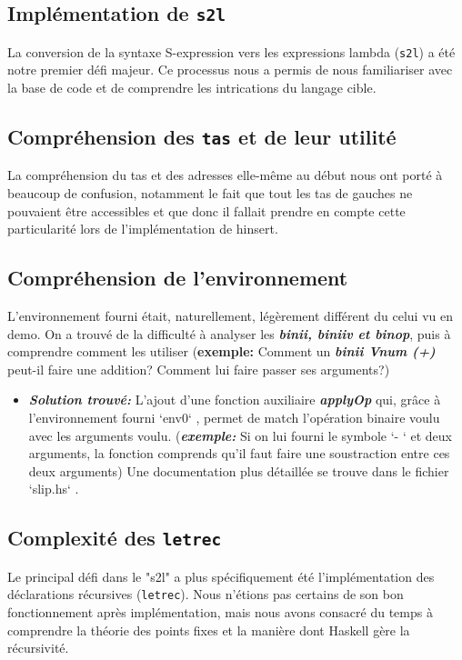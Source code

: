 \documentclass[12pt]{article}
\begin{document}
\subsection{Implémentation de \texttt{s2l}}
La conversion de la syntaxe S-expression vers les expressions lambda (\texttt{s2l}) a été notre premier défi majeur. Ce processus nous a permis de nous familiariser avec la base de code et de comprendre les intrications du langage cible.

\subsection{Compréhension des \texttt{tas} et de leur utilité}
La compréhension du tas et des adresses elle-même au début nous ont porté à beaucoup de confusion, notamment le fait que tout les tas de gauches ne pouvaient être accessibles et que donc il fallait prendre en compte cette particularité lors de l'implémentation de hinsert.

\subsection{Compréhension de l'environnement}
L'environnement fourni était, naturellement, légèrement différent du celui vu en demo. On a trouvé de la difficulté à analyser les \textit{\textbf{binii, biniiv et binop}}, puis à comprendre comment les utiliser (\textbf{exemple:} Comment un \textit{\textbf{binii Vnum (+)}} peut-il faire une addition? Comment lui faire passer ses arguments?)
\begin{itemize}
    \item \textit{\textbf{Solution trouvé: }} L'ajout d'une fonction auxiliaire \textbf{\textit{applyOp}} qui, grâce à l'environnement fourni `env0` , permet de match l'opération binaire voulu avec les arguments voulu.  (\textbf{\textit{exemple:}} Si on lui fourni le symbole `- ` et deux arguments, la fonction comprends qu'il faut faire une soustraction entre ces deux arguments)
    Une documentation plus détaillée  se trouve dans le fichier `slip.hs` .
\end{itemize}

\subsection{Complexité des \texttt{letrec}}
Le principal défi dans le "s2l" a plus spécifiquement été l'implémentation des déclarations récursives (\texttt{letrec}). Nous n'étions pas certains de son bon fonctionnement après implémentation, mais nous avons consacré du temps à comprendre la théorie des points fixes et la manière dont Haskell gère la récursivité.
\end{document}
